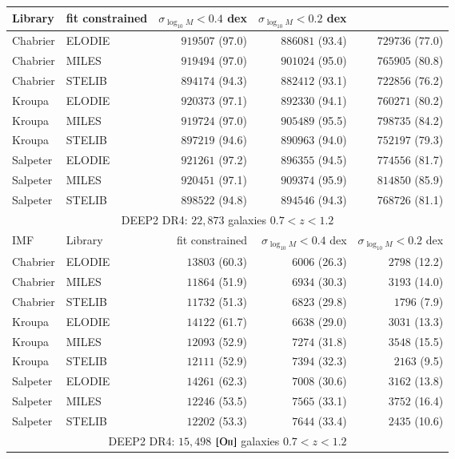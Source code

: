 \documentclass[onecolumn]{aa}
\newcommand{\OII}{$\left[\mathrm{O\textrm{\textsc{ii}}}\right]$\xspace}
\begin{document}
\begin{table*}
\begin{center}
\begin{tabular}{ll rrr}
Library & 
fit constrained & 
$\sigma_{\log_{10}M}<0.4$ dex & 
$\sigma_{\log_{10}M}<0.2$ dex \\ \hline
Chabrier & ELODIE & $919507$ (97.0) & $886081$ (93.4) & $729736$ (77.0) \\ 
Chabrier & MILES & $919494$ (97.0) & $901024$ (95.0) & $765905$ (80.8) \\ 
Chabrier & STELIB & $894174$ (94.3) & $882412$ (93.1) & $722856$ (76.2) \\ 
Kroupa & ELODIE & $920373$ (97.1) & $892330$ (94.1) & $760271$ (80.2) \\ 
Kroupa & MILES & $919724$ (97.0) & $905489$ (95.5) & $798735$ (84.2) \\ 
Kroupa & STELIB & $897219$ (94.6) & $890963$ (94.0) & $752197$ (79.3) \\ 
Salpeter & ELODIE & $921261$ (97.2) & $896355$ (94.5) & $774556$ (81.7) \\ 
Salpeter & MILES & $920451$ (97.1) & $909374$ (95.9) & $814850$ (85.9) \\ 
Salpeter & STELIB & $898522$ (94.8) & $894546$ (94.3) & $768726$ (81.1) \\ 
\hline 
\multicolumn{5}{c}{DEEP2 DR4: $22,873$ galaxies $0.7<z<1.2$} \\                
IMF &                                                                          
Library & 
fit constrained & 
$\sigma_{\log_{10}M}<0.4$ dex & 
$\sigma_{\log_{10}M}<0.2$ dex \\ \hline
Chabrier & ELODIE& $13803$ (60.3) & $6006$ (26.3) & $2798$ (12.2) \\ 
Chabrier & MILES& $11864$ (51.9) & $6934$ (30.3) & $3193$ (14.0) \\ 
Chabrier & STELIB& $11732$ (51.3) & $6823$ (29.8) & $1796$ (7.9) \\ 
Kroupa & ELODIE& $14122$ (61.7) & $6638$ (29.0) & $3031$ (13.3) \\ 
Kroupa & MILES& $12093$ (52.9) & $7274$ (31.8) & $3548$ (15.5) \\ 
Kroupa & STELIB& $12111$ (52.9) & $7394$ (32.3) & $2163$ (9.5) \\ 
Salpeter & ELODIE& $14261$ (62.3) & $7008$ (30.6) & $3162$ (13.8) \\ 
Salpeter & MILES& $12246$ (53.5) & $7565$ (33.1) & $3752$ (16.4) \\ 
Salpeter & STELIB& $12202$ (53.3) & $7644$ (33.4) & $2435$ (10.6) \\ 
\hline 
\multicolumn{5}{c}{DEEP2 DR4: $15,498$ \OII galaxies $0.7<z<1.2$} \\

\end{tabular}
\end{center}
\end{table*}
\end{document}
